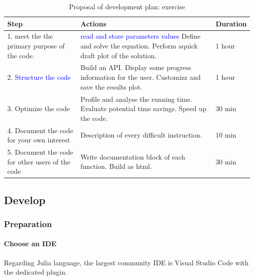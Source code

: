 \documentclass[11pt]{article}
\begin{document}
				\begin{table}[h!]
					\scriptsize
					\centering
					\caption{Proposal of development plan: exercise}
					\begin{tabular}{|p{4cm}|p{6cm}|p{2cm}|}
						\hline
						\textbf{Step} & \textbf{Actions} & \textbf{Duration} \\
						\hline
						1. meet the the primary purpose of the code.
						&
						\textcolor{blue}{read and store parameters values} \newline
						Define and solve the equation. \newline
						Perform aquick draft plot of the solution.
						&
						1 hour
						\\
						\hline
						2. \textcolor{blue}{Structure the code}
						& Build an API. \newline
						Display some progress information for the user. \newline
						Customizz and save the results plot.
						& 1 hour
						\\
						\hline
						3. Optimize the code
						& Profile and analyse the running time. \newline
						Evaluate potential time savings. \newline
						Speed up the code.
						& 30 min \\
						\hline
						4. Document the code for your own interest
						& Description of every difficult instruction.
						& 10 min \\
						\hline
						5. Document the code for other users of the code
						& Write documentation block of each function. \newline
						Build as html.
						& 30 min \\

						\hline

					\end{tabular}
					\label{tab:planning_ex}
				\end{table}

		\subsection{Develop}

			\subsubsection{Preparation}

				\paragraph{Choose an IDE}
					Regarding Julia language, the largest community IDE is Visual Studio Code with the dedicated plugin.
\end{document}
